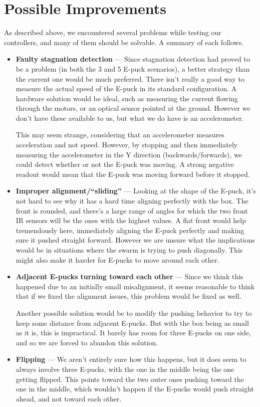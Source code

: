\documentclass[a4paper,12pt]{article}
\begin{document}
\section{Possible Improvements}
As described above, we encountered several problems while testing our controllers, and many of them should be solvable. A summary of each follows.
\begin{itemize}
\item \textbf{Faulty stagnation detection} --- Since stagnation detection had proved to be a problem (in both the 3 and 5 E-puck scenarios), a better strategy than the current one would be much preferred. There isn't really a good way to measure the actual speed of the E-puck in its standard configuration. A hardware solution would be ideal, such as measuring the current flowing through the motors, or an optical sensor pointed at the ground. However we don't have these available to us, but what we do have is an accelerometer.

This may seem strange, considering that an accelerometer measures acceleration and not speed. However, by stopping and then immediately measuring the accelerometer in the Y direction (backwards/forwards), we could detect whether or not the E-puck was moving. A strong negative readout would mean that the E-puck was moving forward before it stopped.

\item \textbf{Improper alignment/``sliding''} --- Looking at the shape of the E-puck, it's not hard to see why it has a hard time aligning perfectly with the box. The front is rounded, and there's a large range of angles for which the two front IR sensors will be the ones with the highest values. A flat front would help tremendously here, immediately aligning the E-puck perfectly and making sure it pushed straight forward. However we are unsure what the implications would be in situations where the swarm is trying to push diagonally. This might also make it harder for E-pucks to move around each other.

\item \textbf{Adjacent E-pucks turning toward each other} --- Since we think this happened due to an initially small misalignment, it seems reasonable to think that if we fixed the alignment issues, this problem would be fixed as well.

Another possible solution would be to modify the pushing behavior to try to keep some distance from adjacent E-pucks. But with the box being as small as it is, this is impractical. It barely has room for three E-pucks on one side, and so we are forced to abandon this solution.

\item \textbf{Flipping} --- We aren't entirely sure how this happens, but it does seem to always involve three E-pucks, with the one in the middle being the one getting flipped. This points toward the two outer ones pushing toward the one in the middle, which wouldn't happen if the E-pucks would push straight ahead, and not toward each other.
\end{itemize}
\end{document}
